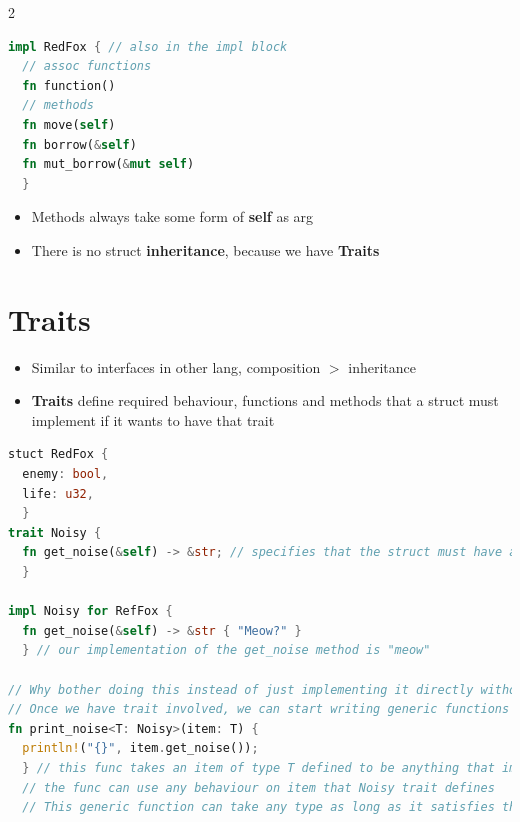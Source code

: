 \documentclass{report}
\begin{document}
\begin{multicols*}{2}
\begin{tcolorbox}[title=Defining Methods,colback=backcolour,size=small,left=4mm]
\begin{lstlisting}[language=rust]
impl RedFox { // also in the impl block
  // assoc functions
  fn function()
  // methods
  fn move(self)
  fn borrow(&self)
  fn mut_borrow(&mut self)
  }
\end{lstlisting}
\end{tcolorbox}

\begin{itemize}
  \item Methods always take some form of \textbf{self} as arg 
  \item There is no struct \textbf{inheritance}, because we have \textbf{Traits}
\end{itemize}

\section{Traits}

\begin{itemize}
  \item Similar to interfaces in other lang, composition $>$ inheritance 
  \item \textbf{Traits} define required behaviour, functions and methods that a struct
    must implement if it wants to have that trait
\end{itemize}

\begin{tcolorbox}[title=Example,colback=backcolour,size=small,left=4mm]
\begin{lstlisting}[language=rust]
stuct RedFox {
  enemy: bool,
  life: u32,
  }
trait Noisy {
  fn get_noise(&self) -> &str; // specifies that the struct must have a method named get_noise() returning a borrowed string slice if the struct wants to be Noisy
  }

impl Noisy for RefFox {
  fn get_noise(&self) -> &str { "Meow?" }
  } // our implementation of the get_noise method is "meow"

// Why bother doing this instead of just implementing it directly without traits ?
// Once we have trait involved, we can start writing generic functions that accept any value implementing the trait
fn print_noise<T: Noisy>(item: T) {
  println!("{}", item.get_noise());
  } // this func takes an item of type T defined to be anything that implements the Noisy trait
  // the func can use any behaviour on item that Noisy trait defines
  // This generic function can take any type as long as it satisfies the noisy trait


\end{lstlisting}
\end{tcolorbox}
\end{multicols*}
\end{document}
